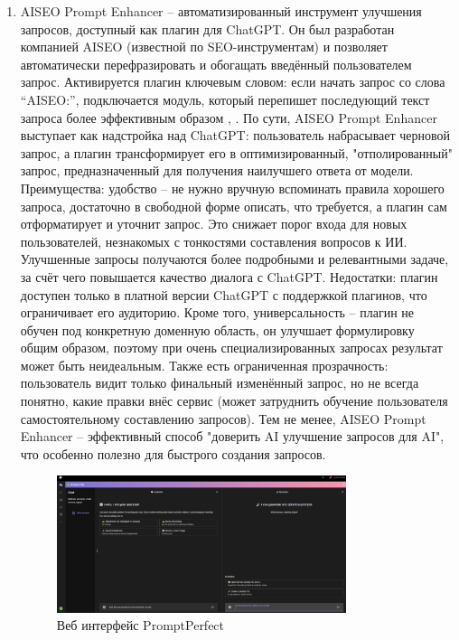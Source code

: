 \begin{enumerate}[label=\arabic*]
\item AISEO Prompt Enhancer – автоматизированный инструмент улучшения запросов, доступный как плагин для ChatGPT. Он был разработан компанией AISEO (известной по SEO-инструментам) и позволяет автоматически перефразировать и обогащать введённый пользователем запрос. Активируется плагин ключевым словом: если начать запрос со слова “AISEO:”, подключается модуль, который перепишет последующий текст запроса более эффективным образом \cite{restack:advprompt}, \cite{whatplugin:promptenhancer}. По сути, AISEO Prompt Enhancer выступает как надстройка над ChatGPT: пользователь набрасывает черновой запрос, а плагин трансформирует его в оптимизированный, "отполированный" запрос, предназначенный для получения наилучшего ответа от модели. Преимущества: удобство – не нужно вручную вспоминать правила хорошего запроса, достаточно в свободной форме описать, что требуется, а плагин сам отформатирует и уточнит запрос. Это снижает порог входа для новых пользователей, незнакомых с тонкостями составления вопросов к ИИ\cite{whatplugin:promptenhancer}. Улучшенные запросы получаются более подробными и релевантными задаче, за счёт чего повышается качество диалога с ChatGPT. Недостатки: плагин доступен только в платной версии ChatGPT с поддержкой плагинов, что ограничивает его аудиторию. Кроме того, универсальность – плагин не обучен под конкретную доменную область, он улучшает формулировку общим образом, поэтому при очень специализированных запросах результат может быть неидеальным. Также есть ограниченная прозрачность: пользователь видит только финальный изменённый запрос, но не всегда понятно, какие правки внёс сервис (может затруднить обучение пользователя самостоятельному составлению запросов). Тем не менее, AISEO Prompt Enhancer – эффективный способ "доверить AI улучшение запросов для AI", что особенно полезно для быстрого создания запросов.
\begin{figure}[htbp]
    \centering
    \includegraphics[width=0.8\textwidth]{picture/prompt-perfect.png}
    \caption{Веб интерфейс PromptPerfect}
    \label{prompt_perfect}

\end{figure}
\end{enumerate}
